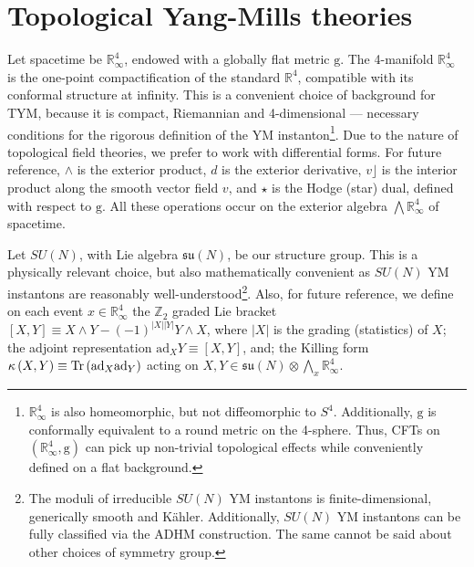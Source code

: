 \documentclass[../main.tex]{subfiles}
\begin{document}
\section{Topological Yang-Mills theories}\label{sec:tym}

Let spacetime be $\mathbb{R}^{4}_{\infty}$, endowed with a globally flat metric $\mathrm{g}$. The 4-manifold $\mathbb{R}^{4}_{\infty}$ is the one-point compactification of the standard $\mathbb{R}^4$, compatible with its conformal structure at infinity. This is a convenient choice of background for TYM, because it is compact, Riemannian and 4-dimensional --- necessary conditions for the rigorous definition of the YM instanton\footnote{$\mathbb{R}^{4}_{\infty}$ is also homeomorphic, but not diffeomorphic to $S^4$. Additionally, $\mathrm{g}$ is conformally equivalent to a round metric on the 4-sphere. Thus, CFTs on $\left( \mathbb{R}^{4}_{\infty}, \mathrm{g}\right)$ can pick up non-trivial topological effects while conveniently defined on a flat background.}. Due to the nature of topological field theories, we prefer to work with differential forms. For future reference, $\wedge$ is the exterior product, $d$ is the exterior derivative, $v \rfloor$ is the interior product along the smooth vector field $v$, and $\star$ is the Hodge (star) dual, defined with respect to $\mathrm{g}$. All these operations occur on the exterior algebra $\bigwedge \mathbb{R}^{4}_{\infty}$ of spacetime.

Let $SU(N)$, with Lie algebra $\mathfrak{su}(N)$, be our structure group. This is a physically relevant choice, but also mathematically convenient as $SU(N)$ YM instantons are reasonably well-understood\footnote{The moduli of irreducible $SU(N)$ YM instantons is finite-dimensional, generically smooth and Kähler. Additionally, $SU(N)$ YM instantons can be fully classified via the ADHM construction. The same cannot be said about other choices of symmetry group.}. Also, for future reference, we define on each event $x \in \mathbb{R}^{4}_{\infty}$ the $\mathbb{Z}_2$ graded Lie bracket $[X,Y] \equiv X \wedge Y-{(-1)}^{|X||Y|}Y \wedge X$, where $|X|$ is the grading (statistics) of $X$; the adjoint representation $\mathrm{ad}_X Y \equiv \left[X, Y\right]$, and; the Killing form $\kappa \left(X,Y\right) \equiv \operatorname{Tr} \left( \mathrm{ad}_{X} \mathrm{ad}_{Y} \right)$ acting on $X, Y \in \mathfrak{su}(N) \otimes \bigwedge_x \mathbb{R}^{4}_{\infty}$.
\end{document}

